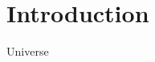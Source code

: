 \chapter{\label{intro}Introduction}
Universe
\setcounter{equation}{0}
\setcounter{table}{0}
\setcounter{figure}{0}


    



